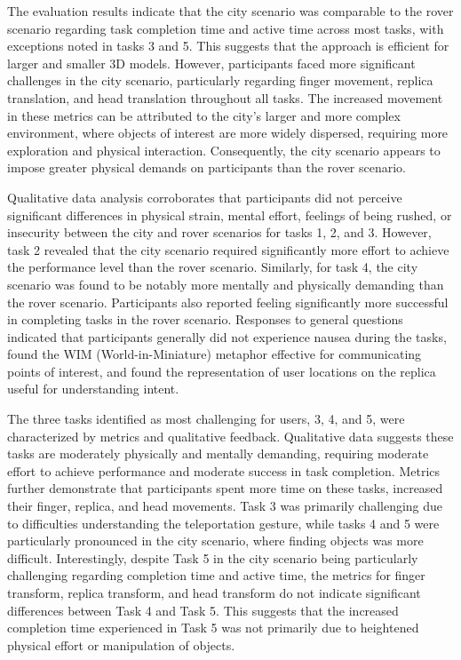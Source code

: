         The evaluation results indicate that the city scenario was comparable to the rover scenario regarding task completion time and active time across most tasks, with exceptions noted in tasks 3 and 5. This suggests that the approach is efficient for larger and smaller 3D models. However, participants faced more significant challenges in the city scenario, particularly regarding finger movement, replica translation, and head translation throughout all tasks. The increased movement in these metrics can be attributed to the city's larger and more complex environment, where objects of interest are more widely dispersed, requiring more exploration and physical interaction. Consequently, the city scenario appears to impose greater physical demands on participants than the rover scenario.

        Qualitative data analysis corroborates that participants did not perceive significant differences in physical strain, mental effort, feelings of being rushed, or insecurity between the city and rover scenarios for tasks 1, 2, and 3. However, task 2 revealed that the city scenario required significantly more effort to achieve the performance level than the rover scenario. Similarly, for task 4, the city scenario was found to be notably more mentally and physically demanding than the rover scenario. Participants also reported feeling significantly more successful in completing tasks in the rover scenario. Responses to general questions indicated that participants generally did not experience nausea during the tasks, found the WIM (World-in-Miniature) metaphor effective for communicating points of interest, and found the representation of user locations on the replica useful for understanding intent.

        The three tasks identified as most challenging for users, 3, 4, and 5, were characterized by metrics and qualitative feedback. Qualitative data suggests these tasks are moderately physically and mentally demanding, requiring moderate effort to achieve performance and moderate success in task completion. Metrics further demonstrate that participants spent more time on these tasks, increased their finger, replica, and head movements. Task 3 was primarily challenging due to difficulties understanding the teleportation gesture, while tasks 4 and 5 were particularly pronounced in the city scenario, where finding objects was more difficult. Interestingly, despite Task 5 in the city scenario being particularly challenging regarding completion time and active time, the metrics for finger transform, replica transform, and head transform do not indicate significant differences between Task 4 and Task 5. This suggests that the increased completion time experienced in Task 5 was not primarily due to heightened physical effort or manipulation of objects.
        
